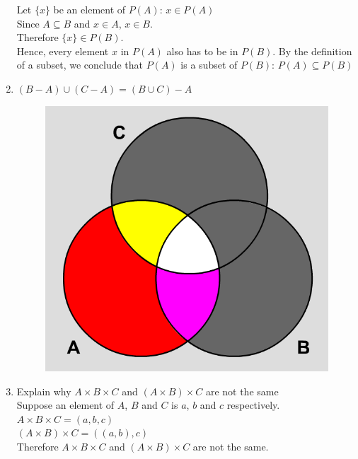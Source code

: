 \documentclass[12pt,en,a4paper]{article}
\begin{document}
\begin{enumerate}
		Let $\{x\}$ be an element of $P(A)$: $x\in P(A)$\\
		Since $A \subseteq B$ and $x \in A$, $x\in B$.\\
		Therefore $\{x\} \in P(B)$.\\
		Hence, every element $x$ in $P(A)$ also has to be in $P(B)$. By the definition of a subset, we conclude that $P(A)$ is a subset of $P(B)$: $P(A) \subseteq P(B)$
		\newpage
		\item $(B-A)\cup(C-A) = (B \cup C)-A$\\
		\begin{figure}[h]
			\centering
			\begin{minipage}{0.5\textwidth}
				\includegraphics[width=1.0\textwidth]{SOL_set_6_1.png}
				\label{fig:prob_6_1}
			\end{minipage}
		\end{figure}
		\item Explain why $A \times B \times C$ and $(A \times B) \times C$ are not the same\\
		
		Suppose an element of $A$, $B$ and $C$ is $a$, $b$ and $c$ respectively.\\
		$A\times B\times C = (a,b,c)$\\
		$(A\times B)\times C = ((a,b),c)$\\
		
		Therefore $A\times B\times C$ and $(A\times B)\times C$ are not the same.
	\end{enumerate}
\newpage
{}
\end{document}
